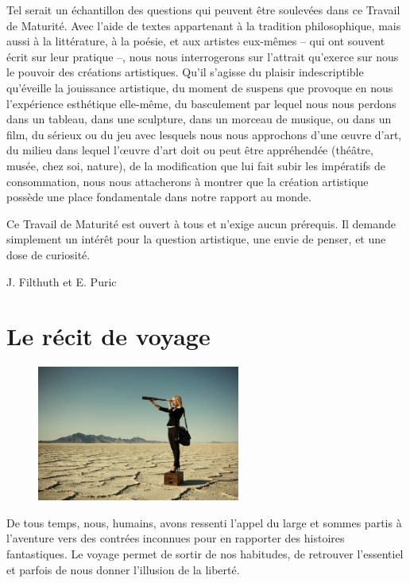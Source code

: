 \documentclass[
  10pt,
  french,
  a5paper,
  openany]{book}
\newenvironment{signature}{\begin{flushright}}{\end{flushright}}
\begin{document}
Tel serait un échantillon des questions qui peuvent être soulevées dans ce Travail de Maturité. Avec l'aide de textes appartenant à la tradition philosophique, mais aussi à la littérature, à la poésie, et aux artistes eux-mêmes -- qui ont souvent écrit sur leur pratique --, nous nous interrogerons sur l'attrait qu'exerce sur nous le pouvoir des créations artistiques. Qu'il s'agisse du plaisir indescriptible qu'éveille la jouissance artistique, du moment de suspens que provoque en nous l'expérience esthétique elle-même, du basculement par lequel nous nous perdons dans un tableau, dans une sculpture, dans un morceau de musique, ou dans un film, du sérieux ou du jeu avec lesquels nous nous approchons d'une œuvre d'art, du milieu dans lequel l'œuvre d'art doit ou peut être appréhendée (théâtre, musée, chez soi, nature), de la modification que lui fait subir les impératifs de consommation, nous nous attacherons à montrer que la création artistique possède une place fondamentale dans notre rapport au monde.

Ce Travail de Maturité est ouvert à tous et n'exige aucun prérequis. Il demande simplement un intérêt pour la question artistique, une envie de penser, et une dose de curiosité.

\begin{signature}
J. Filthuth et E. Puric

\end{signature}

\hypertarget{le-ruxe9cit-de-voyage}{%
\chapter{Le récit de voyage}\label{le-ruxe9cit-de-voyage}}

\begin{figure}

{\centering \includegraphics[height=12em]{images/le-recit-de-voyage} 

}

\end{figure}

De tous temps, nous, humains, avons ressenti l'appel du large et sommes partis à l'aventure vers des contrées inconnues pour en rapporter des histoires fantastiques. Le voyage permet de sortir de nos habitudes, de retrouver l'essentiel et parfois de nous donner l'illusion de la liberté.
\end{document}

